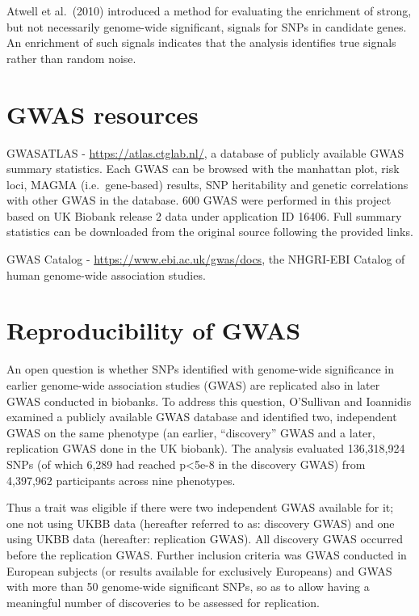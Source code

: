 \documentclass[
]{book}
\begin{document}
Atwell et al.~(2010) introduced a method for evaluating the enrichment of strong, but not necessarily genome-wide significant, signals for SNPs in candidate genes. An enrichment of such signals indicates that the analysis identifies true signals rather than random noise.

\hypertarget{gwas-resources}{%
\section{GWAS resources}\label{gwas-resources}}

GWASATLAS - \url{https://atlas.ctglab.nl/}, a database of publicly available GWAS summary statistics. Each GWAS can be browsed with the manhattan plot, risk loci, MAGMA (i.e.~gene-based) results, SNP heritability and genetic correlations with other GWAS in the database. 600 GWAS were performed in this project based on UK Biobank release 2 data under application ID 16406. Full summary statistics can be downloaded from the original source following the provided links.

GWAS Catalog - \url{https://www.ebi.ac.uk/gwas/docs}, the NHGRI-EBI Catalog of human genome-wide association studies.

\hypertarget{reproducibility-of-gwas}{%
\section{Reproducibility of GWAS}\label{reproducibility-of-gwas}}

An open question is whether SNPs identified with genome-wide significance in earlier genome-wide association studies (GWAS) are replicated also in later GWAS conducted in biobanks. To address this question, O'Sullivan and Ioannidis examined a publicly available GWAS database and identified two, independent GWAS on the same phenotype (an earlier, ``discovery'' GWAS and a later, replication GWAS done in the UK biobank). The analysis evaluated 136,318,924 SNPs (of which 6,289 had reached p\textless5e-8 in the discovery GWAS) from 4,397,962 participants across nine phenotypes.

Thus a trait was eligible if there were two independent GWAS available for it; one not using UKBB data (hereafter referred to as: discovery GWAS) and one using UKBB data (hereafter: replication GWAS). All discovery GWAS occurred before the replication GWAS. Further inclusion criteria was GWAS conducted in European subjects (or results available for exclusively Europeans) and GWAS with more than 50 genome-wide significant SNPs, so as to allow having a meaningful number of discoveries to be assessed for replication.
\end{document}

